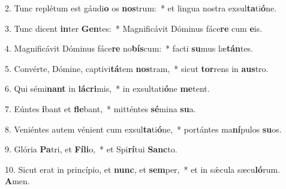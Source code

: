 2. Tunc replétum est gáudi\textbf{o} os \textbf{nos}trum:~*  et lingua nostra exsul\textbf{ta}ti\textbf{ó}ne.\

3. Tunc dicent \textbf{in}ter \textbf{Gen}tes:~*  Magnificávit Dóminus fáce\textbf{re} cum \textbf{e}is.\

4. Magnificávit Dóminus fáce\textbf{re} no\textbf{bís}cum:~*  facti \textbf{su}mus læ\textbf{tán}tes.\

5. Convérte, Dómine, captivi\textbf{tá}tem \textbf{nos}tram,~*  sicut \textbf{tor}rens in \textbf{aus}tro.\

6. Qui sémi\textbf{nant} in \textbf{lá}\textbf{cri}mis,~*  in exsultati\textbf{ó}ne \textbf{me}tent.\

7. Eúntes \textbf{i}bant et \textbf{fle}bant,~*  mitténtes \textbf{sé}mina \textbf{su}a.\

8. Veniéntes autem vénient cum exsul\textbf{ta}ti\textbf{ó}ne,~*  portántes ma\textbf{ní}pulos \textbf{su}os.\

9. Glória \textbf{Pa}tri, et \textbf{Fí}\textbf{li}o,~*  et Spi\textbf{rí}tui \textbf{Sanc}to.\

10. Sicut erat in princípio, et \textbf{nunc}, et \textbf{sem}per,~*  et in sǽcula sæcu\textbf{ló}rum. \textbf{A}men.\

